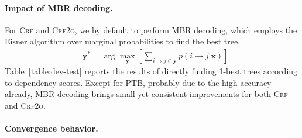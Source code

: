 


\paragraph{Impact of MBR decoding.} For \textsc{Crf} and \textsc{Crf2o}, we by default to perform MBR decoding, which employs the Eisner algorithm over marginal probabilities \cite{smith-smith-2007-probabilistic} to find the best tree.
\begin{equation}
    \begin{split}
        & {\boldsymbol{y}}^* = \arg\max_{\boldsymbol{y}} \left[\sum_{i \rightarrow j \in \boldsymbol{y}}{p(i \rightarrow j|\boldsymbol{x})} \right]
    \end{split}
\end{equation}
Table~\ref{table:dev-test} reports the results of directly finding 1-best trees according to dependency scores. %
Except for PTB, probably due to the high accuracy already, MBR decoding brings small yet consistent improvements for both \textsc{Crf} and \textsc{Crf2o}.

\paragraph{Convergence behavior.}


